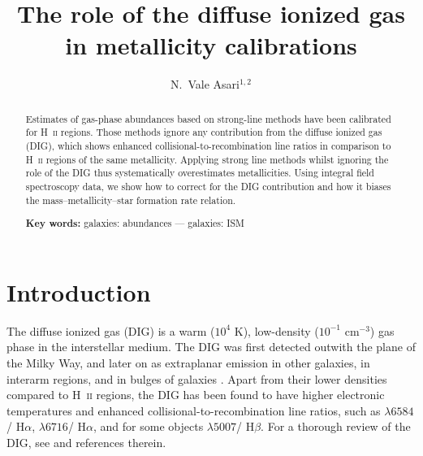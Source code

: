 \documentclass[11pt,twoside]{article}
\newcommand{\hii}{H~{\scshape ii}\xspace}
\newcommand{\Ha}{\ifmmode {\mathrm{H}\alpha} \else H$\alpha$\fi\xspace}
\newcommand{\Hb}{\ifmmode {\mathrm{H}\beta} \else H$\beta$\fi\xspace}
\newcommand{\Oiii}{\ifmmode [\text{O}\,\textsc{iii}]\lambda 5007 \else [O~{\scshape iii}]$\lambda 5007$\fi\xspace}
\newcommand{\Nii}{\ifmmode [\text{N}\,\textsc{ii}]\lambda 6584 \else [N~{\scshape ii}]$\lambda 6584$\fi\xspace}
\newcommand{\Sii}{\ifmmode [\text{S}\,\textsc{ii}]\lambda 6716 \else [S~{\scshape ii}]$\lambda 6716$\fi\xspace}
\begin{document}

\vskip 1.0cm
\pagestyle{myheadings}
%
%
\vspace*{0.5cm}


\vspace*{0.5cm}
\title{The role of the diffuse ionized gas in metallicity calibrations}


\author{N.~Vale Asari$^{1, 2}$}


\begin{abstract}
  Estimates of gas-phase abundances based on strong-line methods have
  been calibrated for \hii regions.  Those methods ignore any
  contribution from the diffuse ionized gas (DIG), which shows
  enhanced collisional-to-recombination line ratios in comparison to
  \hii regions of the same metallicity. Applying strong line methods
  whilst ignoring the role of the DIG thus systematically
  overestimates metallicities. Using integral field spectroscopy data,
  we show how to correct for the DIG contribution and how it biases
  the mass--metallicity--star formation rate relation.

\bigskip
\textbf{Key words: } %
galaxies: abundances --- galaxies: ISM

\end{abstract}

\section{Introduction}


The diffuse ionized gas (DIG) is a warm ($10^4$ K), low-density
($10^{-1}$ cm$^{-3}$) gas phase in the interstellar medium. The DIG
was first detected outwith the plane of the Milky Way, and later on as
extraplanar emission in other galaxies, in interarm regions, and in
bulges of galaxies \citep[e.g.][]{Hoyle.Ellis.1963a, Dettmar.1990a,
  Gomes.etal.2016c}.  Apart from their lower densities compared to
\hii regions, the DIG has been found to have higher electronic
temperatures and enhanced collisional-to-recombination line ratios,
such as \Nii/\Ha, \Sii/\Ha, and for some objects \Oiii/\Hb.  For a
thorough review of the DIG, see \citet{Haffner.etal.2009a} and
references therein.
\end{document}
